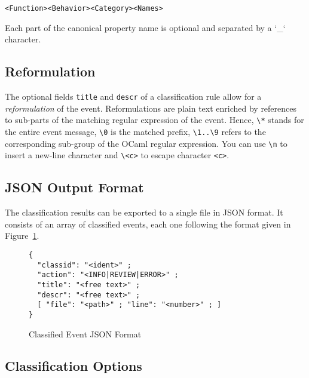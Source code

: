 \begin{verbatim}
<Function><Behavior><Category><Names>
\end{verbatim}

Each part of the canonical property name is optional and separated by a `\_` character.

\subsection{Reformulation}

The optional fields \verb+title+ and \verb+descr+ of a classification rule allow for a \emph{reformulation} of the event.
Reformulations are plain text enriched by references to sub-parts of the matching regular expression of the event.
Hence, \verb+\*+ stands for the entire event message, \verb+\0+ is the matched prefix, \verb+\1..\9+ refers to the corresponding
sub-group of the \textsf{OCaml} regular expression. You can use \verb+\n+ to insert a new-line character and \verb+\<c>+ to escape
character \verb+<c>+.

\subsection{JSON Output Format}

The classification results can be exported to a single file in JSON format. It consists of an array of classified events,
each one following the format given in Figure~\ref{report-classified-event}.

\begin{figure}[htbp]
\begin{verbatim}
{
  "classid": "<ident>" ;
  "action": "<INFO|REVIEW|ERROR>" ;
  "title": "<free text>" ;
  "descr": "<free text>" ;
  [ "file": "<path>" ; "line": "<number>" ; ]
}
\end{verbatim}
\caption{Classified Event JSON Format}
\label{report-classified-event}
\end{figure}

\subsection{Classification Options}
\label{report-classification-options}

